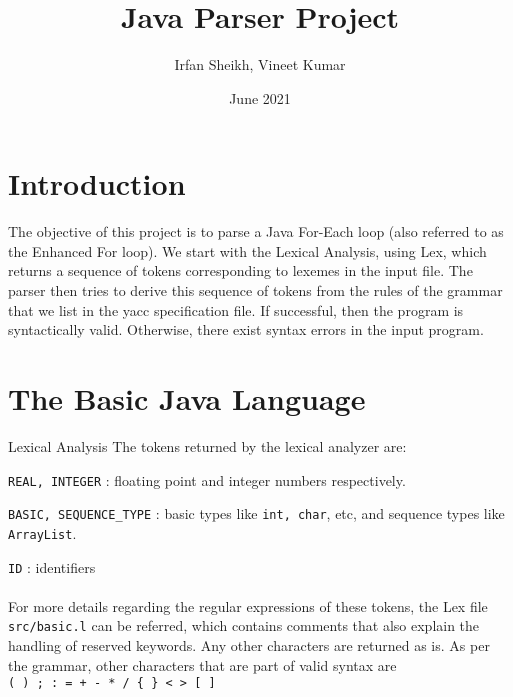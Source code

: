 \documentclass{article}
\title{Java Parser Project}
\author{Irfan Sheikh, Vineet Kumar}
\date{June 2021}
\begin{document}
\maketitle

\tableofcontents

\section{Introduction}

The objective of this project is to parse a Java For-Each loop (also referred to as the Enhanced For loop). We start with the Lexical Analysis, using Lex, which returns a sequence of tokens corresponding to lexemes in the input file. The parser then tries to derive this sequence of tokens from the rules of the grammar that we list in the yacc specification file. If successful, then the program is syntactically valid. Otherwise, there exist syntax errors in the input program.

\section{The Basic Java Language}

\begin{subsection}{Lexical Analysis}
The tokens returned by the lexical analyzer are:

\texttt{REAL, INTEGER} : floating point and integer numbers respectively.

\texttt{BASIC, SEQUENCE\_TYPE} : basic types like \texttt{int, char}, etc, and sequence types like \texttt{ArrayList}.

\texttt{ID} : identifiers
\\ \\
For more details regarding the regular expressions of these tokens, the Lex file \texttt{src/basic.l} can be referred, which contains comments that also explain the handling of reserved keywords. Any other characters are returned as is. As per the grammar, other characters that are part of valid syntax are \\
\texttt{( ) ; : = + - * / \{ \} < > [ ] }

\end{subsection}
\end{document}
